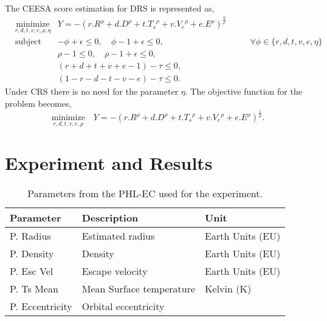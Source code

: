 \documentclass[10pt]{article}
\begin{document}
The CEESA score estimation for DRS is represented as,
\begin{equation}\label{eq:ceesadrs}
  \begin{aligned}
    & \underset{r,d,t,v,e,\rho,\eta}{\text{minimize}}
    & Y = {-}{(r.R^\rho+d.D^\rho+t.{T_s}^\rho+v.{V_e}^\rho+e.E^\rho)}^{\frac{\eta}{\rho}}\\
    & \text{subject to}
    &   {-}\phi + \epsilon \leq 0,\quad\phi - 1 + \epsilon \leq 0, &\quad\quad \forall \phi\in\{r,d,t,v,e,\eta\}\\
    && \rho - 1 \leq 0,\quad \rho - 1 + \epsilon \leq 0,\\
    && (r+d+t+v+e-1) - \tau \leq 0,\\
    && (1-r-d-t-v-e) - \tau \leq 0.
  \end{aligned}
\end{equation}
Under CRS there is no need for the parameter $\eta$. The objective function for the problem becomes,
\begin{equation}\label{eq:ceesacrs}
  \underset{r,d,t,v,e,\rho}{\text{minimize}}\quad
  Y = {-}{(r.R^\rho+d.D^\rho+t.{T_s}^\rho+v.{V_e}^\rho+e.E^\rho)}^{\frac{1}{\rho}}.
\end{equation}


\section{Experiment and Results}\label{sec:results}

\begin{table}
  \begin{center}
    \begin{tabular}{l l l}
      \toprule
      \textbf{Parameter} & \textbf{Description} & \textbf{Unit}\\
      \midrule
      P. Radius       & Estimated radius         & Earth Units (EU)\\
      P. Density      & Density                  & Earth Units (EU)\\
      P. Esc Vel      & Escape velocity          & Earth Units (EU)\\
      P. Ts Mean      & Mean Surface temperature & Kelvin (K)\\
      P. Eccentricity & Orbital eccentricity\\
      \bottomrule
    \end{tabular}
  \end{center}
  \caption{Parameters from the PHL-EC used for the experiment.}\label{tab:param}
\end{table}
\end{document}
